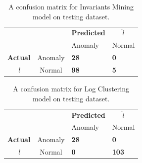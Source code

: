 \begin{table}[!h]
\centering
\begin{tabular}{cccc}
\multicolumn{1}{r}{}                 &                              & \textbf{Predicted}          &   $\hat{l}$                          \\ \cline{3-4} 
                                     & \multicolumn{1}{l|}{}        & \multicolumn{1}{l|}{Anomaly} & \multicolumn{1}{l|}{Normal} \\ \cline{2-4} 
                                      
\multicolumn{1}{l|}{\textbf{Actual}} & \multicolumn{1}{l|}{Anomaly}  & \multicolumn{1}{l|}{\textcolor{customBlue}{\textbf{28}}}     & \multicolumn{1}{l|}{\textcolor{customRed}{\textbf{0}}}      \\ \cline{2-4} 
\multicolumn{1}{c|}{\textit{l}}                & \multicolumn{1}{c|}{Normal} & \multicolumn{1}{l|}{\textcolor{customDarkRed}{\textbf{98}}}     & \multicolumn{1}{l|}{\textcolor{customGreen}{\textbf{5}}}      \\ \cline{2-4} 
\end{tabular}
\caption{A confusion matrix for Invariants Mining model on testing dataset.}
\label{table:confusionMatrix:im}
\end{table}

\begin{table}[!h]
\centering
\begin{tabular}{cccc}
\multicolumn{1}{r}{}                 &                              & \textbf{Predicted}          &   $\hat{l}$                          \\ \cline{3-4} 
                                     & \multicolumn{1}{l|}{}        & \multicolumn{1}{l|}{Anomaly} & \multicolumn{1}{l|}{Normal} \\ \cline{2-4} 
                                      
\multicolumn{1}{l|}{\textbf{Actual}} & \multicolumn{1}{l|}{Anomaly}  & \multicolumn{1}{l|}{\textcolor{customBlue}{\textbf{28}}}     & \multicolumn{1}{l|}{\textcolor{customRed}{\textbf{0}}}      \\ \cline{2-4} 
\multicolumn{1}{c|}{\textit{l}}                & \multicolumn{1}{c|}{Normal} & \multicolumn{1}{l|}{\textcolor{customDarkRed}{\textbf{0}}}     & \multicolumn{1}{l|}{\textcolor{customGreen}{\textbf{103}}}      \\ \cline{2-4} 
\end{tabular}
\caption{A confusion matrix for Log Clustering model on testing dataset.}
\label{table:confusionMatrix:clustering}
\end{table}


